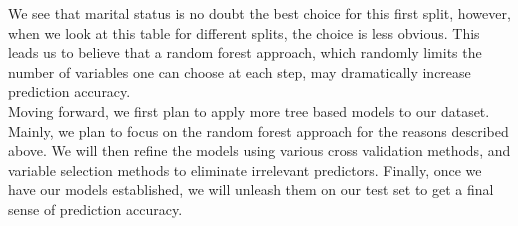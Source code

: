 \documentclass{article}
\begin{document}
We see that marital status is no doubt the best choice for this first split, however, when we look at this table for different splits, the choice is less obvious. This leads us to believe that a random forest approach, which randomly limits the number of variables one can choose at each step, may dramatically increase prediction accuracy. \\

Moving forward, we first plan to apply more tree based models to our dataset. Mainly, we plan to focus on the random forest approach for the reasons described above. We will then refine the models using various cross validation methods, and variable selection methods to eliminate irrelevant predictors. Finally, once we have our models established, we will unleash them on our test set to get a final sense of prediction accuracy.  
\end{document}
